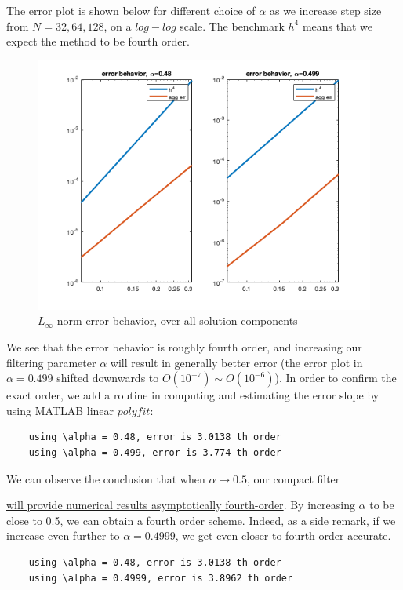 \documentclass[12pt]{article}
\begin{document}
The error plot is shown below for different choice of $\alpha$ as we increase step size from $N=32,64,128$, on a $log-log$ scale. The benchmark $h^4$ means that we expect the method to be fourth order.

\begin{figure}[h]
\centering
\includegraphics[width=1.0\textwidth]{errors.png}
\caption{$L_{\infty}$ norm error behavior, over all solution components}
\end{figure}

\newpage
We see that the error behavior is roughly fourth order, and increasing our filtering parameter $\alpha$ will result in generally better error (the error plot in $\alpha = 0.499$ shifted downwards to $O(10^{-7}) \sim O(10^{-6})$). In order to confirm the exact order, we add a routine in computing and estimating the error slope by using MATLAB linear $polyfit$:

\begin{verbatim}
	using \alpha = 0.48, error is 3.0138 th order
	using \alpha = 0.499, error is 3.774 th order
\end{verbatim}

We can observe the conclusion that when $\alpha \rightarrow 0.5$, our compact filter

\noindent\underline{will provide numerical results asymptotically fourth-order}. By increasing $\alpha$ to be close to 0.5, we can obtain a fourth order scheme. 
\newpage
Indeed, as a side remark, if we increase even further to $\alpha=0.4999$, we get even closer to fourth-order accurate.
\begin{verbatim}
	using \alpha = 0.48, error is 3.0138 th order
	using \alpha = 0.4999, error is 3.8962 th order
\end{verbatim}
\end{document}
